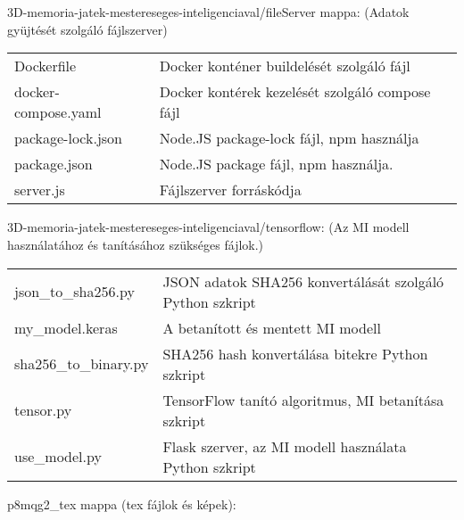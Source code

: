 \\
\\
\noindent 3D-memoria-jatek-mestereseges-inteligenciaval/fileServer mappa: (Adatok gyüjtését szolgáló fájlszerver) \\
\begin{tabular}{l l}
    \quad Dockerfile  & \quad Docker konténer buildelését szolgáló fájl \\ 
    \quad docker-compose.yaml  & \quad Docker kontérek kezelését szolgáló compose fájl \\ 
    \quad package-lock.json  & \quad Node.JS package-lock fájl, npm használja\\ 
    \quad package.json  & \quad Node.JS package fájl, npm használja. \\ 
    \quad server.js  & \quad Fájlszerver forráskódja \\ 
\end{tabular}

\newpage

\noindent 3D-memoria-jatek-mestereseges-inteligenciaval/tensorflow: (Az MI modell használatához és tanításához szükséges fájlok.) \\
\begin{tabular}{l l}
    \quad json\_to\_sha256.py  & \quad JSON adatok SHA256 konvertálását szolgáló Python szkript \\ 
    \quad my\_model.keras  & \quad A betanított és  mentett MI modell \\ 
    \quad sha256\_to\_binary.py  & \quad SHA256 hash konvertálása bitekre Python szkript \\ 
    \quad tensor.py  & \quad TensorFlow tanító algoritmus, MI betanítása szkript \\ 
    \quad use\_model.py  & \quad Flask szerver, az MI modell használata Python szkript\\ 
\end{tabular}


\noindent p8mqg2\_tex mappa (tex fájlok és képek): \\
\begin{tabular}{l l}

\end{tabular}
\vspace{28pt}

